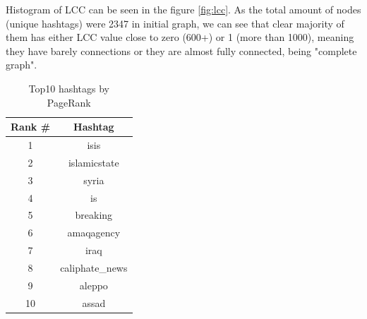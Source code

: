 \documentclass[conference]{IEEEtran}
\begin{document}
    Histogram of LCC can be seen in the figure \ref{fig:lcc}.
    As the total amount of nodes (unique hashtags) were 2347 in initial graph, we can see that clear majority of them has either LCC value close to zero (600+) or 1 (more than 1000), meaning
    they have barely connections or they are almost fully connected, being "complete graph".


    \begin{table}
        \begin{tabular}{ |c|c|}
            \hline
            Rank # & Hashtag         \\
            \hline
            1      & isis            \\
            \hline
            2      & islamicstate    \\
            \hline
            3      & syria           \\
            \hline
            4      & is              \\
            \hline
            5      & breaking        \\
            \hline
            6      & amaqagency      \\
            \hline
            7      & iraq            \\
            \hline
            8      & caliphate\_news \\
            \hline
            9      & aleppo          \\
            \hline
            10     & assad           \\
            \hline
        \end{tabular}
        \caption{Top10 hashtags by PageRank}
        \label{tab:hashtag-names}
    \end{table}
\end{document}

